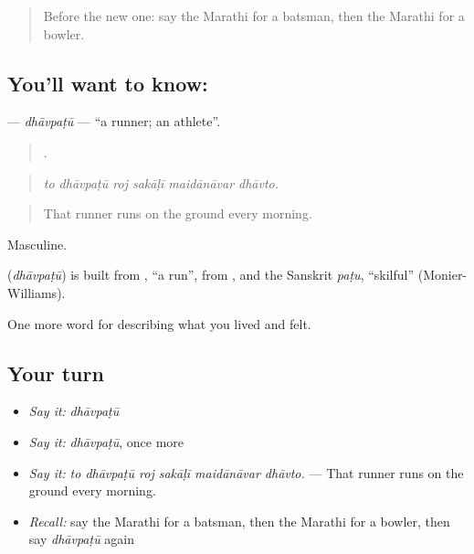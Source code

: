\label{lesson:MR-C531-dhavpatu}



\begin{quote}
Before the new one: say the Marathi for a batsman, then the Marathi for a bowler.
\end{quote}

\subsection*{You'll want to know: }
\textbf{} — \emph{dhāvpaṭū} — \textquotedblleft{}a runner; an athlete\textquotedblright{}.

\begin{quote}
     .
\end{quote}

\begin{quote}
\emph{to dhāvpaṭū roj sakāḷī maidānāvar dhāvto.}
\end{quote}

\begin{quote}
That runner runs on the ground every morning.
\end{quote}

Masculine.

\begin{cousinweb}
\textbf{} (\emph{dhāvpaṭū}) is built from , \textquotedblleft{}a run\textquotedblright{}, from , and the Sanskrit \emph{paṭu}, \textquotedblleft{}skilful\textquotedblright{} (Monier-Williams).
\end{cousinweb}

\begin{grammarlens}[title={What you've built}]
One more word for describing what you lived and felt.
\end{grammarlens}

\subsection*{Your turn}
\begin{itemize}
\raggedright
  \item \emph{Say it:} \emph{dhāvpaṭū}
  \item \emph{Say it:} \emph{dhāvpaṭū}, once more
  \item \emph{Say it:} \emph{to dhāvpaṭū roj sakāḷī maidānāvar dhāvto.} — That runner runs on the ground every morning.
  \item \emph{Recall:} say the Marathi for a batsman, then the Marathi for a bowler, then say \emph{dhāvpaṭū} again
\end{itemize}

